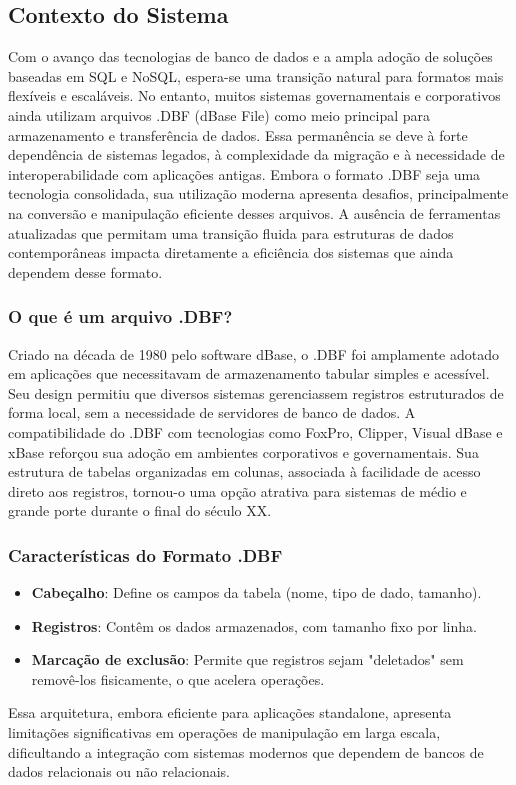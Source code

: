 \begin{titlepage}
    \section{Contexto do Sistema}
      Com o avanço das tecnologias de banco de dados e a ampla adoção de soluções baseadas em SQL e NoSQL, espera-se uma transição natural para formatos mais flexíveis e escaláveis. No entanto, muitos sistemas governamentais e corporativos ainda utilizam arquivos .DBF (dBase File) como meio principal para armazenamento e transferência de dados. Essa permanência se deve à forte dependência de sistemas legados, à complexidade da migração e à necessidade de interoperabilidade com aplicações antigas.
      Embora o formato .DBF seja uma tecnologia consolidada, sua utilização moderna apresenta desafios, principalmente na conversão e manipulação eficiente desses arquivos. A ausência de ferramentas atualizadas que permitam uma transição fluida para estruturas de dados contemporâneas impacta diretamente a eficiência dos sistemas que ainda dependem desse formato.
    \subsubsection{O que é um arquivo .DBF?}
    Criado na década de 1980 pelo software dBase, o .DBF foi amplamente adotado em aplicações que necessitavam de armazenamento tabular simples e acessível. Seu design permitiu que diversos sistemas gerenciassem registros estruturados de forma local, sem a necessidade de servidores de banco de dados.
    A compatibilidade do .DBF com tecnologias como FoxPro, Clipper, Visual dBase e xBase reforçou sua adoção em ambientes corporativos e governamentais. Sua estrutura de tabelas organizadas em colunas, associada à facilidade de acesso direto aos registros, tornou-o uma opção atrativa para sistemas de médio e grande porte durante o final do século XX.
    \subsubsection{Características do Formato .DBF}
    \begin{itemize}
        \item \textbf{Cabeçalho}: Define os campos da tabela (nome, tipo de dado, tamanho).
        \item \textbf{Registros}: Contêm os dados armazenados, com tamanho fixo por linha.
        \item \textbf{Marcação de exclusão}: Permite que registros sejam "deletados" sem removê-los fisicamente, o que acelera operações.
    \end{itemize}
    Essa arquitetura, embora eficiente para aplicações standalone, apresenta limitações significativas em operações de manipulação em larga escala, dificultando a integração com sistemas modernos que dependem de bancos de dados relacionais ou não relacionais.


\end{titlepage}
